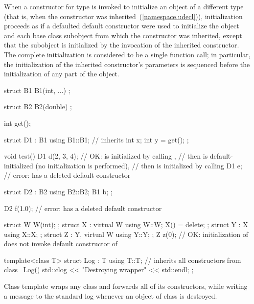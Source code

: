 \pnum
When a constructor for type  is invoked
to initialize an object of a different type 
(that is, when the constructor was inherited~(\ref{namespace.udecl})),
initialization proceeds as if a defaulted default constructor
were used to initialize the  object and
each base class subobject from which the constructor was inherited,
except that the  subobject is initialized
by the invocation of the inherited constructor.
The complete initialization is considered to be a single function call;
in particular, the initialization of the inherited constructor's parameters
is sequenced before the initialization of any part of the  object.
\enterexample
\begin{codeblock}
struct B1 {
  B1(int, ...) { }
};

struct B2 {
  B2(double) { }
};

int get();

struct D1 : B1 {
  using B1::B1;  // inherits 
  int x;
  int y = get();
};

void test() {
  D1 d(2, 3, 4); // OK:  is initialized by calling ,
                 // then  is default-initialized (no initialization is performed),
                 // then  is initialized by calling 
  D1 e;          // error:  has a deleted default constructor
}

struct D2 : B2 {
  using B2::B2;
  B1 b;
};

D2 f(1.0);       // error:  has a deleted default constructor

struct W { W(int); };
struct X : virtual W { using W::W; X() = delete; };
struct Y : X { using X::X; };
struct Z : Y, virtual W { using Y::Y; };
Z z(0); // OK: initialization of  does not invoke default constructor of 

template<class T> struct Log : T {
  using T::T;    // inherits all constructors from class 
  ~Log() { std::clog << "Destroying wrapper" << std::endl; }
};
\end{codeblock}
Class template  wraps any class and forwards all of its constructors,
while writing a message to the standard log
whenever an object of class  is destroyed.
\exitexample

